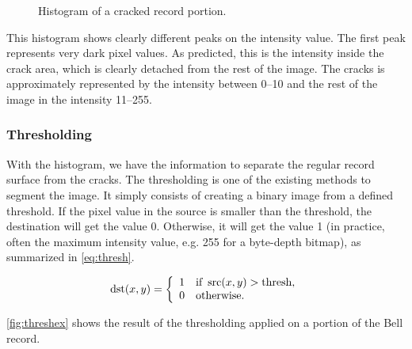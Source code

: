 \begin{figure}[!ht]
\centering
{}
\caption{Histogram of a cracked record portion.}
\label{fig:histocrack}
\end{figure}

This histogram shows clearly different peaks on the intensity value. The first peak represents very dark pixel values. As predicted, this is the intensity inside the crack area, which is clearly detached from the rest of the image. The cracks is approximately represented by the intensity between \numrange[range-phrase=--]{0}{10} and the rest of the image in the intensity \numrange[range-phrase=--]{11}{255}.

\subsubsection{Thresholding}
\label{sec:chunkthresh}

With the histogram, we have the information to separate the regular record surface from the cracks. The thresholding is one of the existing methods to segment the image. It simply consists of creating a binary image from a defined threshold. If the pixel value in the source is smaller than the threshold, the destination will get the value 0. Otherwise, it will get the value 1 (in practice, often the maximum intensity value, e.g. 255 for a byte-depth bitmap), as summarized in \eqref{eq:thresh}.

\begin{equation}
\label{eq:thresh}
\operatorname{dst}(x, y) =
\left\{
\begin{array}{l l}
    1 & \text{if } \operatorname{src}(x, y) > \text{thresh},\\
    0 & \text{otherwise}.
\end{array}
\right.
\end{equation}

\autoref{fig:threshex} shows the result of the thresholding applied on a portion of the Bell record.

